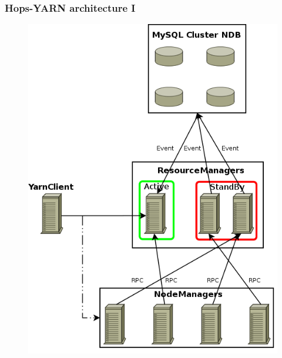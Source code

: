 \documentclass{beamer}
\begin{document}
\begin{frame}
\frametitle{Hops-YARN architecture I}

\begin{figure}
\centering
\includegraphics[scale=0.3]{resources/hopsyarn_arch_overview.png}
\end{figure}
\end{frame}
\end{document}

